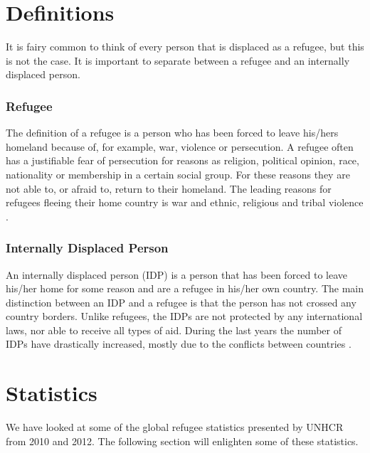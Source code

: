 
\section{Definitions}
It is fairy common to think of every person that is displaced as a refugee, but this is not the case. It is important to separate between a refugee and an internally displaced person. 

\subsubsection{Refugee} The definition of a refugee is a person who has been forced to leave his/hers homeland because of, for example, war, violence or persecution. A refugee often has a justifiable fear of persecution for reasons as religion, political opinion, race, nationality or membership in a certain social group. For these reasons they are not able to, or
afraid to, return to their homeland. The leading reasons for refugees fleeing their home country is war and ethnic, religious and tribal violence \cite{refugeeDef}.

\subsubsection{Internally Displaced Person} An internally displaced person (IDP) is a person that has been forced to leave his/her home for some reason and are a refugee in his/her own country. The main distinction between an IDP and a refugee is that the person has not crossed any country borders. Unlike refugees, the IDPs are not protected by any international laws, nor able to receive all types of aid. During the last years the number of IDPs have drastically increased, mostly due to the conflicts between countries \cite{refugeeDef}. 


\section{Statistics}
We have looked at some of the global refugee statistics presented by UNHCR from 2010 and 2012. The following section will enlighten some of these statistics. 

